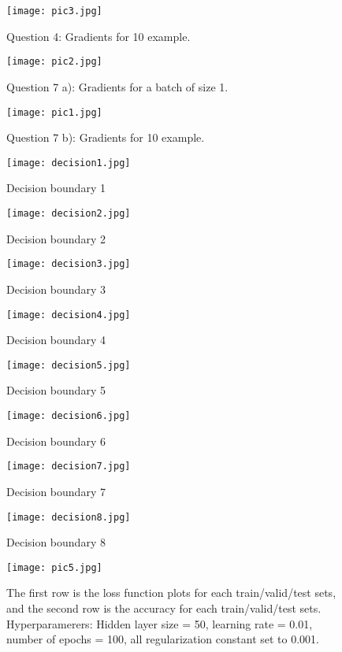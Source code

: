 \documentclass[11pt,english]{article}
\begin{document}
\begin{figure}
	\texttt{[image: pic3.jpg]}
	\caption{Question 4: Gradients for 10 example.}
	\label{fig:boat1}
\end{figure}

\begin{figure}
	\texttt{[image: pic2.jpg]}
	\caption{Question 7 a): Gradients for a batch of size 1.}
	\label{fig:boat1}
\end{figure}

\begin{figure}
	\texttt{[image: pic1.jpg]}
	\caption{Question 7 b): Gradients for 10 example.}
	\label{fig:boat1}
\end{figure}

\begin{figure}
	\texttt{[image: decision1.jpg]}
	\caption{Decision boundary 1}
	\label{fig:boat1}
\end{figure}


\begin{figure}
	\texttt{[image: decision2.jpg]}
	\caption{Decision boundary 2}
	\label{fig:boat1}
\end{figure}

\begin{figure}
	\texttt{[image: decision3.jpg]}
	\caption{Decision boundary 3}
	\label{fig:boat1}
\end{figure}

\begin{figure}
	\texttt{[image: decision4.jpg]}
	\caption{Decision boundary 4}
	\label{fig:boat1}
\end{figure}

\begin{figure}
	\texttt{[image: decision5.jpg]}
	\caption{Decision boundary 5}
	\label{fig:boat1}
\end{figure}

\begin{figure}
	\texttt{[image: decision6.jpg]}
	\caption{Decision boundary 6}
	\label{fig:boat1}
\end{figure}

\begin{figure}
	\texttt{[image: decision7.jpg]}
	\caption{Decision boundary 7}
	\label{fig:boat1}
\end{figure}


\begin{figure}
	\texttt{[image: decision8.jpg]}
	\caption{Decision boundary 8}
	\label{fig:boat1}
\end{figure}

\begin{figure}
	\texttt{[image: pic5.jpg]}
	\caption{The first row is the loss function plots for each train/valid/test sets, and the second row is the accuracy for each train/valid/test sets. Hyperparamerers: Hidden layer size = 50, learning rate = 0.01, number of epochs = 100, all regularization constant set to 0.001.}
	\label{fig:boat1}
\end{figure}
\end{document}
